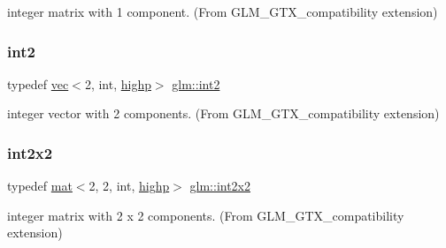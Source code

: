 integer matrix with 1 component. (From G\+L\+M\+\_\+\+G\+T\+X\+\_\+compatibility extension) 

\mbox{\label{group__gtx__compatibility_ga3a3a6007d7619dee4f6c425fe7ac24eb}} 
\subsubsection{\texorpdfstring{int2}{int2}}
{\footnotesize\ttfamily typedef \hyperlink{structglm_1_1vec}{vec}$<$2, int, \hyperlink{namespaceglm_a36ed105b07c7746804d7fdc7cc90ff25ac6f7eab42eacbb10d59a58e95e362074}{highp}$>$ \hyperlink{group__gtx__compatibility_ga3a3a6007d7619dee4f6c425fe7ac24eb}{glm\+::int2}}



integer vector with 2 components. (From G\+L\+M\+\_\+\+G\+T\+X\+\_\+compatibility extension) 

\mbox{\label{group__gtx__compatibility_ga8884c82366cc406dd20e00b78969d001}} 
\subsubsection{\texorpdfstring{int2x2}{int2x2}}
{\footnotesize\ttfamily typedef \hyperlink{structglm_1_1mat}{mat}$<$2, 2, int, \hyperlink{namespaceglm_a36ed105b07c7746804d7fdc7cc90ff25ac6f7eab42eacbb10d59a58e95e362074}{highp}$>$ \hyperlink{group__gtx__compatibility_ga8884c82366cc406dd20e00b78969d001}{glm\+::int2x2}}



integer matrix with 2 x 2 components. (From G\+L\+M\+\_\+\+G\+T\+X\+\_\+compatibility extension) 

\mbox{\label{group__gtx__compatibility_ga13c7e3ba6d19765d8877cccf05c2e520}} 
